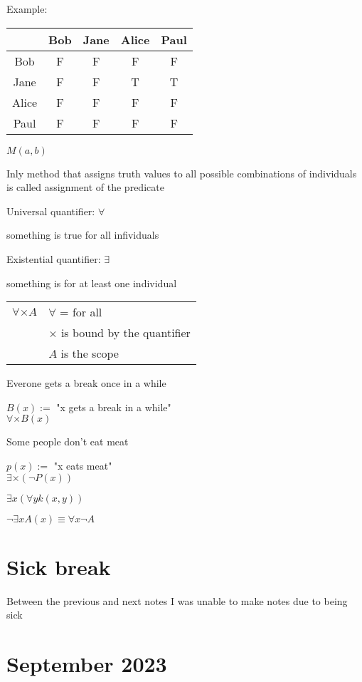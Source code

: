 \documentclass{article}
\let\stdsection\section
\renewcommand\section{\newpage\stdsection}
\begin{document}
Example:
\begin{tabular}{|c|cccc|}
  \hline
  & Bob & Jane & Alice & Paul \\ \hline
  Bob & F & F & F & F \\
  Jane & F & F & T & T \\
  Alice & F & F & F & F \\
  Paul & F & F & F & F \\
  \hline  
\end{tabular}

$M(a, b)$

Inly method that assigns truth values to all possible combinations of individuals is called assignment of the predicate



Universal quantifier: $\forall$

something is true for all infividuals

Existential quantifier: $\exists$

something is for at least one individual

\begin{tabular}{cl}
  $\forall \times A$ & $\forall$ = for all \\
  & $\times$ is bound by the quantifier \\
  & $A$ is the scope
\end{tabular}

Everone gets a break once in a while

$B(x) := $ "x gets a break in a while"\\
$\forall \times B\left(x\right)$

Some people don't eat meat

$p(x) := $ "x eats meat"\\
$\exists \times \left( \neg P \left( x \right)  \right)$


$\exists x \left( \forall y k \left( x, y \right) \right)$

$\neg \exists x A\left( x \right) \equiv \forall x \neg A$


\section{Sick break}
Between the previous and next notes I was unable to make notes due to being sick

\section{ September 2023}
\end{document}
